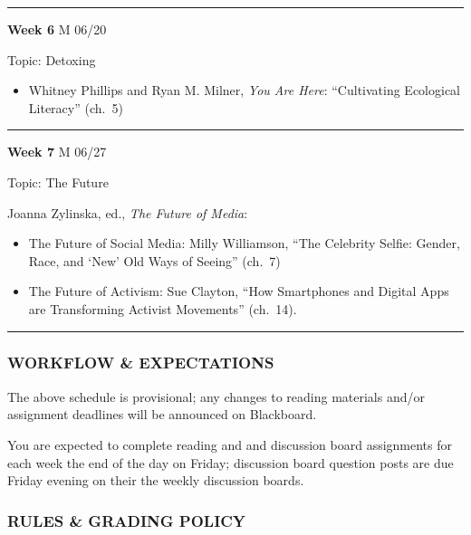 \documentclass[]{tufte-handout}
\providecommand{\tightlist}{%
  \setlength{\itemsep}{0pt}\setlength{\parskip}{0pt}}
\begin{document}
\begin{center}\rule{0.5\linewidth}{0.5pt}\end{center}

\textbf{Week 6} M 06/20

Topic: Detoxing

\begin{itemize}
\tightlist
\item
  Whitney Phillips and Ryan M. Milner, \emph{You Are Here}:
  ``Cultivating Ecological Literacy'' (ch.~5)
\end{itemize}

\begin{center}\rule{0.5\linewidth}{0.5pt}\end{center}

\textbf{Week 7} M 06/27

Topic: The Future

Joanna Zylinska, ed., \emph{The Future of Media}:

\begin{itemize}
\tightlist
\item
  The Future of Social Media: Milly Williamson, ``The Celebrity Selfie:
  Gender, Race, and `New' Old Ways of Seeing'' (ch.~7)
\item
  The Future of Activism: Sue Clayton, ``How Smartphones and Digital
  Apps are Transforming Activist Movements'' (ch.~14).
\end{itemize}

\begin{center}\rule{0.5\linewidth}{0.5pt}\end{center}

\hypertarget{workflow-expectations}{%
\subsubsection{WORKFLOW \& EXPECTATIONS}\label{workflow-expectations}}

The above schedule is provisional; any changes to reading materials
and/or assignment deadlines will be announced on Blackboard.

You are expected to complete reading and and discussion board
assignments for each week the end of the day on Friday; discussion board
question posts are due Friday evening on their the weekly discussion
boards.

\hypertarget{rules-grading-policy}{%
\subsubsection{RULES \& GRADING POLICY}\label{rules-grading-policy}}
\end{document}
